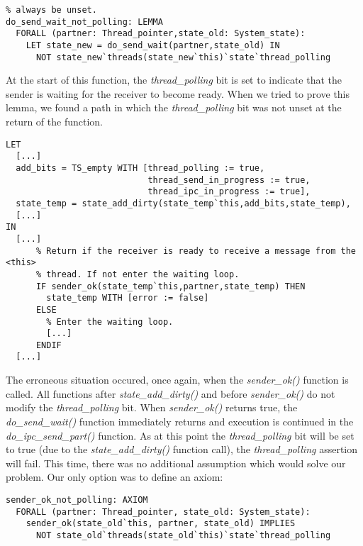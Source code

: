 \lstset{language=PVS}
\begin{lstlisting}[caption={PVS: unset \emph{thread\_polling()} bit invariant.}]
% After calling do_send_wait(), the <this> thread's <thread_polling> bit will
% always be unset.
do_send_wait_not_polling: LEMMA
  FORALL (partner: Thread_pointer,state_old: System_state):
    LET state_new = do_send_wait(partner,state_old) IN
      NOT state_new`threads(state_new`this)`state`thread_polling
\end{lstlisting}

At the start of this function, the \emph{thread\_polling} bit is set to indicate that the sender is waiting for the receiver to become ready. When we tried to prove this lemma, we found a path in which the \emph{thread\_polling} bit was not unset at the return of the function.

\lstset{language=PVS}
\begin{lstlisting}[caption={PVS: \emph{do\_send\_wait()} function, problematic \emph{thread\_polling} path.}]
% Create a thread state which bits to add to the <this> thread.
LET
  [...]
  add_bits = TS_empty WITH [thread_polling := true,
                            thread_send_in_progress := true,
                            thread_ipc_in_progress := true],
  state_temp = state_add_dirty(state_temp`this,add_bits,state_temp),    
  [...]
IN
  [...]
	  % Return if the receiver is ready to receive a message from the <this>
	  % thread. If not enter the waiting loop.
	  IF sender_ok(state_temp`this,partner,state_temp) THEN
	    state_temp WITH [error := false]
	  ELSE
	    % Enter the waiting loop.
	    [...]
	  ENDIF
  [...]
\end{lstlisting}

The erroneous situation occured, once again, when the \emph{sender\_ok()} function is called. All functions after \emph{state\_add\_dirty()} and before \emph{sender\_ok()} do not modify the \emph{thread\_polling} bit. When \emph{sender\_ok()} returns true, the \emph{do\_send\_wait()} function immediately returns and execution is continued in the \emph{do\_ipc\_send\_part()} function. As at this point the \emph{thread\_polling} bit will be set to true (due to the \emph{state\_add\_dirty()} function call), the \emph{thread\_polling} assertion will fail. This time, there was no additional assumption which would solve our problem. Our only option was to define an axiom:

\lstset{language=PVS}
\begin{lstlisting}[caption={PVS: the axiom used in the \emph{do\_send\_wait()} function.}]
% The <thread_polling> bit is not set when sender_ok() returns true.
sender_ok_not_polling: AXIOM
  FORALL (partner: Thread_pointer, state_old: System_state):
    sender_ok(state_old`this, partner, state_old) IMPLIES
      NOT state_old`threads(state_old`this)`state`thread_polling
\end{lstlisting}

